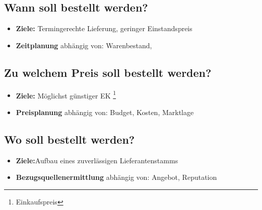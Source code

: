 \documentclass[a4paper,11pt]{scrartcl}	%
\begin{document}
	\subsection{Wann soll bestellt werden?}
 	
 		\begin{itemize}
 			\item \textbf{Ziele:} Termingerechte Lieferung, geringer Einstandspreis
 			\item \textbf{Zeitplanung} abhängig von: Warenbestand, 
 		\end{itemize}
 		
 	\subsection{Zu welchem Preis soll bestellt werden?}
 	
 		\begin{itemize}
 			\item \textbf{Ziele:} Möglichst günstiger EK \footnote{Einkaufspreis}
 			\item \textbf{Preisplanung} abhängig von: Budget, Kosten, Marktlage
 		\end{itemize}
 		
 	\subsection{Wo soll bestellt werden?}
 	
 		\begin{itemize}
 			\item \textbf{Ziele:}Aufbau eines zuverlässigen Lieferantenstamms
 			\item \textbf{Bezugsquellenermittlung} abhängig von: Angebot, Reputation
 		\end{itemize}
\end{document}

